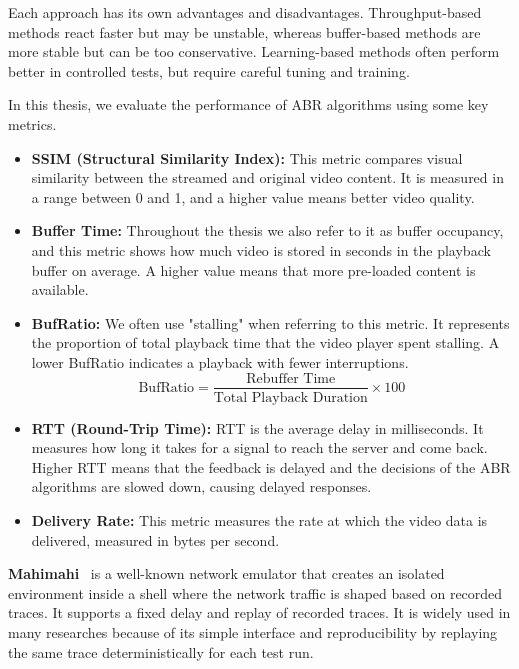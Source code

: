 Each approach has its own advantages and disadvantages. Throughput-based methods react faster but may be unstable, whereas buffer-based methods are more stable but can be too conservative. Learning-based methods often perform better in controlled tests, but require careful tuning and training.

In this thesis, we evaluate the performance of ABR algorithms using some key metrics.

\begin{itemize}
    \item \textbf{SSIM (Structural Similarity Index):} This metric compares visual similarity between the streamed and original video content. It is measured in a range between 0 and 1, and a higher value means better video quality.

    \item \textbf{Buffer Time:} Throughout the thesis we also refer to it as buffer occupancy, and this metric shows how much video is stored in seconds in the playback buffer on average. A higher value means that more pre-loaded content is available.

    \item \textbf{BufRatio:} We often use "stalling" when referring to this metric. It represents the proportion of total playback time that the video player spent stalling. A lower BufRatio indicates a playback with fewer interruptions.
    \[
    \text{BufRatio} = \frac{\text{Rebuffer Time}}{\text{Total Playback Duration}} \times 100
    \]

    \item \textbf{RTT (Round-Trip Time):} RTT is the average delay in milliseconds. It measures how long it takes for a signal to reach the server and come back. Higher RTT means that the feedback is delayed and the decisions of the ABR algorithms are slowed down, causing delayed responses.

    \item \textbf{Delivery Rate:} This metric measures the rate at which the video data is delivered, measured in bytes per second.
\end{itemize}

\textbf{Mahimahi}~\cite{mahimahi} is a well-known network emulator that creates an isolated environment inside a shell where the network traffic is shaped based on recorded traces. It supports a fixed delay and replay of recorded traces. It is widely used in many researches because of its simple interface and reproducibility by replaying the same trace deterministically for each test run.

